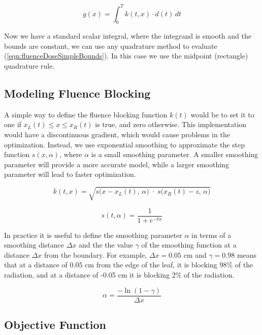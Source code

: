 \begin{equation}
  g(x) = \int_0^T \! k(t, x) \cdot d(t) \, dt
  \label{eqn:fluenceDoseSimpleBounds}
\end{equation}

Now we have a standard scalar integral, where the integrand is smooth and the
bounds are constant, we can use any quadrature method to evaluate (\ref{eqn:fluenceDoseSimpleBounds}).
In this case we use the midpoint (rectangle) quadrature rule.

\subsection{Modeling Fluence Blocking}
\label{sec:modelingFluenceBlocking}

A simple way to define the fluence blocking function $k(t)$
would be to set it to one if $x_L(t) \leq x \leq x_R(t)$
is true, and zero otherwise.
This implementation would have a discontinuous gradient, which would cause problems in the optimization.
Instead, we use exponential smoothing to approximate the step function $s(x,\alpha)$,
where $\alpha$ is a small smoothing parameter.
A smaller smoothing parameter will provide a more accurate model,
while a larger smoothing parameter will lead to faster optimization.

\begin{equation}
  k(t, x) = \sqrt{s\big(x - x_L(t), \, \alpha\big) \; \cdot \; s\big(x_R(t) - z, \, \alpha\big)}
\end{equation}

\begin{equation}
  s(t, \alpha) = \frac{1}{1 + e^{-t \alpha}}
\end{equation}

In practice it is useful to define the smoothing parameter $\alpha$ in terms of
a smoothing distance $\Delta x$ and the the
value $\gamma$ of the smoothing function at a distance $\Delta x$ from the boundary.
For example, $\Delta x = 0.05$ cm and $\gamma = 0.98$ means that
at a distance of 0.05 cm from the edge of the leaf, it is blocking 98\% of the radiation,
and at a distance of -0.05 cm it is blocking 2\% of the radiation.

\begin{equation}
  \alpha = \frac{-\ln(1-\gamma)}{\Delta x}
  \label{eqn:SmoothingDistanceParameter}
\end{equation}

\subsection{Objective Function}

